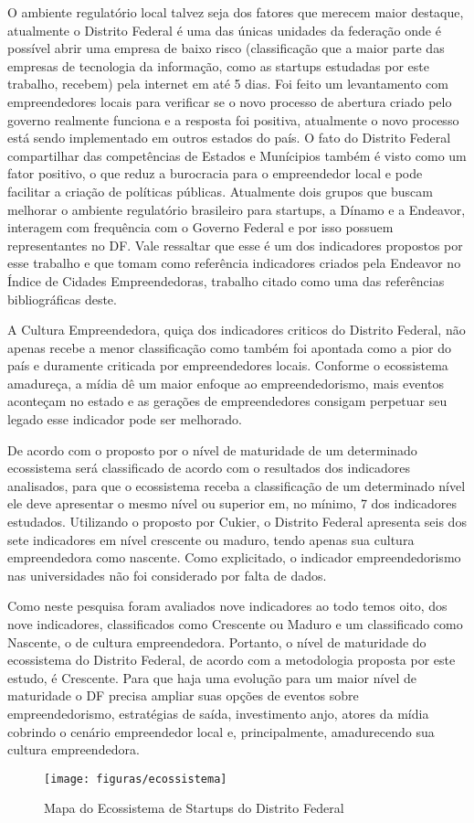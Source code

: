 O ambiente regulatório local talvez seja dos fatores que merecem maior destaque, atualmente o Distrito Federal é uma das únicas unidades da federação onde é possível abrir uma empresa de baixo risco (classificação que a maior parte das empresas de tecnologia da informação, como as startups estudadas por este trabalho, recebem) pela internet em até 5 dias. Foi feito um levantamento com empreendedores locais para verificar se o novo processo de abertura criado pelo governo realmente funciona e a resposta foi positiva, atualmente o novo processo está sendo implementado em outros estados do país. O fato do Distrito Federal compartilhar das competências de Estados e Munícipios também é visto como um fator positivo, o que reduz a burocracia para o empreendedor local e pode facilitar a criação de políticas públicas. Atualmente dois grupos que buscam melhorar o ambiente regulatório brasileiro para startups, a Dínamo e a Endeavor, interagem com frequência com o Governo Federal e por isso possuem representantes no DF. Vale ressaltar que esse é um dos indicadores propostos por esse trabalho e que tomam como referência indicadores criados pela Endeavor no Índice de Cidades Empreendedoras, trabalho citado como uma das referências bibliográficas deste.

A Cultura Empreendedora, quiça dos indicadores criticos do Distrito Federal, não apenas recebe a menor classificação como também foi apontada como a pior do país e duramente criticada por empreendedores locais. Conforme o ecossistema amadureça, a mídia dê um maior enfoque ao empreendedorismo, mais eventos aconteçam no estado e as gerações de empreendedores consigam perpetuar seu legado esse indicador pode ser melhorado.

De acordo com o proposto por  o nível de maturidade de um determinado ecossistema será classificado de acordo com o resultados dos indicadores analisados, para que o ecossistema receba a classificação de um determinado nível ele deve apresentar o mesmo nível ou superior em, no mínimo, 7 dos indicadores estudados. Utilizando o proposto por Cukier, o Distrito Federal apresenta seis dos sete indicadores em nível crescente ou maduro, tendo apenas sua cultura empreendedora como nascente. Como explicitado, o indicador 
empreendedorismo nas universidades não foi considerado por falta de dados. 

Como neste pesquisa foram avaliados nove indicadores ao todo temos oito, dos nove indicadores, classificados como Crescente ou Maduro e um classificado como Nascente, o de cultura empreendedora. Portanto, o nível de maturidade do ecossistema do Distrito Federal, de acordo com a metodologia proposta por este estudo, é Crescente. Para que haja uma evolução para um maior nível de maturidade o DF precisa ampliar suas opções de eventos sobre empreendedorismo, estratégias de saída, investimento anjo, atores da mídia cobrindo o cenário empreendedor local e, principalmente, amadurecendo sua cultura empreendedora.

\begin{figure}[!htb]
	\centering
	\texttt{[image: figuras/ecossistema]}
	\caption{Mapa do Ecossistema de Startups do Distrito Federal}
	\label{figure:ecossistema}
\end{figure} 

